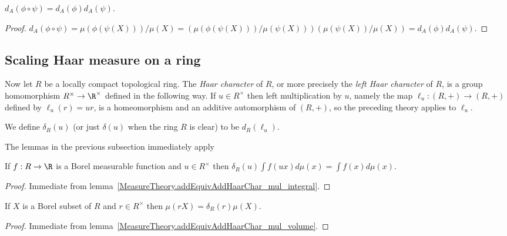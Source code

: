 \begin{lemma}
  \label{MeasureTheory.addEquivAddHaarChar_trans}
  \leanok
  $d_A(\phi\circ\psi)=d_A(\phi)d_A(\psi).$
\end{lemma}
\begin{proof}
  $d_A(\phi\circ\psi)=\mu(\phi(\psi(X)))/\mu(X)=(\mu(\phi(\psi(X)))/\mu(\psi(X)))(\mu(\psi(X))/\mu(X))=d_A(\phi)d_A(\psi).$
\end{proof}

\subsection{Scaling Haar measure on a ring}

Now let $R$ be a locally compact topological ring. The \emph{Haar character} of $R$,
or more precisely the \emph{left Haar character} of $R$, is a group homomorphism
$R^\times\to\R^\times$ defined in the following way. If $u\in R^\times$ then left multiplication
by $u$, namely the map $\ell_u:(R,+)\to(R,+)$ defined by $\ell_u(r)=ur$, is a homeomorphism and
an additive automorphism of $(R,+)$, so the preceding theory applies to $\ell_u$.

\begin{definition}
  \label{MeasureTheory.ringHaarChar}
  \leanok
  We define $\delta_R(u)$ (or just $\delta(u)$ when the ring $R$ is clear) to be $d_R(\ell_u)$.
\end{definition}

The lemmas in the previous subsection immediately apply

\begin{lemma}
  \label{MeasureTheory.ringHaarChar_mul_integral}
  \leanok
  If $f:R\to\R$ is a Borel measurable function and $u\in R^\times$ then
  $\delta_R(u)\int f(ux)d\mu(x)=\int f(x)d\mu(x)$.
\end{lemma}
\begin{proof}
  Immediate from lemma~\ref{MeasureTheory.addEquivAddHaarChar_mul_integral}.
\end{proof}

\begin{lemma}
  \label{MeasureTheory.ringHaarChar_mul_volume}
  \leanok
  If $X$ is a Borel subset of $R$ and $r\in R^\times$ then $\mu(rX)=\delta_R(r)\mu(X)$.
\end{lemma}
\begin{proof}
   Immediate from lemma~\ref{MeasureTheory.addEquivAddHaarChar_mul_volume}.
\end{proof}

